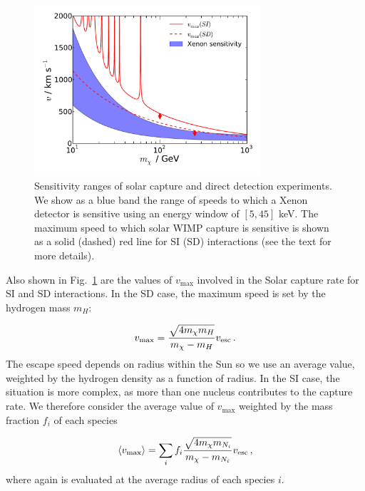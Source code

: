 \begin{figure}[t]
  \centering
  \includegraphics[trim=0.8cm 0.9cm 0cm 0cm, clip,width=0.75\textwidth]{NT/SpeedOverlap.pdf}
  \caption[Speed sensitivity ranges of solar capture and direct detection experiments as a function of WIMP mass]{Sensitivity ranges of solar capture and direct detection experiments. We show as a blue band the range of speeds to which a Xenon detector is sensitive using an energy window of $[5,45]$ keV. The maximum speed to which solar WIMP capture is sensitive is shown as a solid (dashed) red line for SI (SD) interactions (see the text for more details).}
  \label{fig:NT:speedoverlap}
\end{figure}

Also shown in Fig.~\ref{fig:NT:speedoverlap} are the values of $v_\textrm{max}$ involved in the Solar capture rate for SI and SD interactions. In the SD case, the maximum speed is set by the hydrogen mass $m_H$:

\begin{equation}
v_{\textrm{max}} = \frac{\sqrt{4m_\chi m_H}}{m_\chi - m_H}\vesc\,.
\end{equation}
The escape speed \vesc depends on radius within the Sun so we use an average value, weighted by the hydrogen density as a function of radius. In the SI case, the situation is more complex, as more than one nucleus contributes to the capture rate. We therefore consider the average value of $v_\textrm{max}$ weighted by the mass fraction $f_i$ of each species

\begin{equation}
\langle v_{\textrm{max}} \rangle = \sum_i f_i \frac{\sqrt{4m_\chi m_{N_i}}}{m_\chi - m_{N_i}}\vesc\,,
\end{equation}
where again \vesc is evaluated at the average radius of each species $i$.

